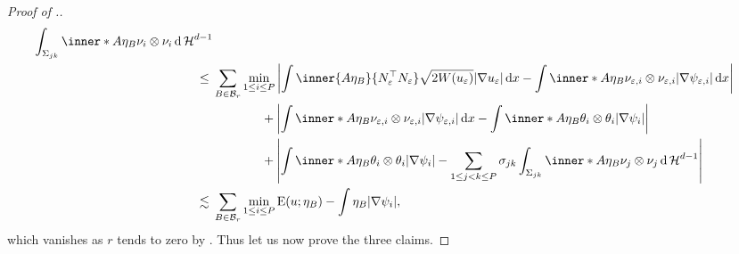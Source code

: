 \begin{proof}[Proof of .]
\begin{align*}
{				\int_{ \Sigma_{ j k } }
					\inner*{ A \eta_{ B } }
					{ \nu_{ i } \otimes \nu_{i } }
				\dd{ \hm^{ d - 1 } }
		}
		\\
		\leq{} &
		\sum_{ B \in \mathcal{ B }_{ r } }
			\min_{ 1 \leq i \leq P }
				\abs{ 
					\int
						\inner{ A \eta_{ B } }{ N_{ \varepsilon }^{ \top } N_{ \varepsilon } }
						\sqrt{ 2 W ( u_{ \varepsilon } ) }
						\abs{ \nabla u_{ \varepsilon } }
					\dd{ x }
					-
					\int
						\inner*{ A \eta_{ B } }
						{ \nu_{ \varepsilon , i }\otimes \nu_{ \varepsilon ,i } 
						}
						\abs{ \nabla \psi_{ \varepsilon,  i } }
					\dd{ x }
				}
			\\
			& \quad \quad \quad \;\;\;\!\: +
			\abs{ 
				\int
					\inner*{ A \eta_{ B } }{ \nu_{ \varepsilon ,i } \otimes 
					\nu_{ \varepsilon , i } }
					\abs{ \nabla \psi_{ \varepsilon, i } }
				\dd{ x }
				-
				\int
					\inner*{ A \eta_{ B } }
					{ \theta_{ i } \otimes \theta_{ i } }
				\abs{ \nabla \psi_{ i } }
			}
			\\
			& \quad \quad \quad \;\;\;\!\: +
			\abs{ 
				\int
					\inner*{ A \eta_{ B } }
					{ \theta_{ i } \otimes \theta_{ i } }
				\abs{ \nabla \psi_{ i } }
				-
				\sum_{ 1 \leq j < k \leq P }
					\sigma_{ j k }
					\int_{ \Sigma_{ j k } }
						\inner*{ A \eta_{ B } }
						{ \nu_{ j } \otimes \nu_{ j } }
					\dd{ \hm^{ d - 1 } }
			}
		\\
		\lesssim {} &
			\sum_{ B \in \mathcal{ B }_{ r } }
				\min_{ 1 \leq i \leq P }
					\energy ( u ; \eta_{ B } )
					-
					\int
						\eta_{ B }
					\abs{ \nabla \psi_{ i } },
	\end{align*}
	which vanishes as $ r $ tends to zero by 
	.
	Thus let us now prove the three claims.
	

\end{proof}
